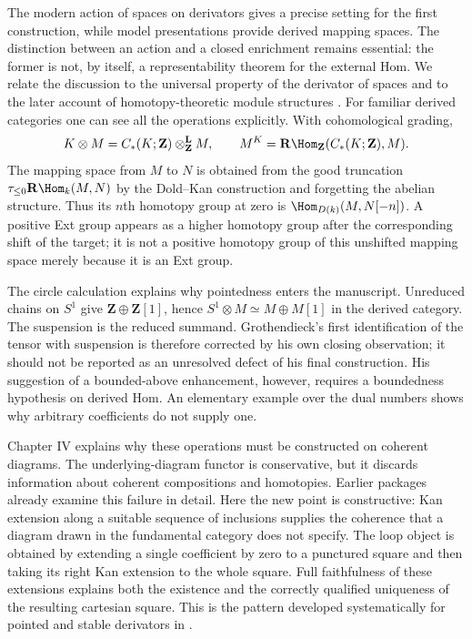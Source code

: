 The modern action of spaces on derivators gives a precise setting for the
first construction, while model presentations provide derived mapping spaces.
The distinction between an action and a closed enrichment remains essential:
the former is not, by itself, a representability theorem for the external
Hom. We relate the discussion to the universal property of the derivator of
spaces and to the later account of homotopy-theoretic module structures
\citep{Cisinski2008,GrothShulman2017}. For familiar derived categories one can
see all the operations explicitly. With cohomological grading,
\[
 K\otimes M=C_*(K;\mathbf Z)\otimes^{\mathbf L}_{\mathbf Z}M,
 \qquad
 M^K=\mathbf R\Hom_{\mathbf Z}(C_*(K;\mathbf Z),M).
\]
The mapping space from $M$ to $N$ is obtained from the good truncation
$\tau_{\leq0}\mathbf R\Hom_k(M,N)$ by the Dold--Kan construction and
forgetting the abelian structure. Thus its $n$th homotopy group at zero is
$\Hom_{D(k)}(M,N[-n])$. A positive Ext group appears as a higher homotopy
group after the corresponding shift of the target; it is not a positive
homotopy group of this unshifted mapping space merely because it is an Ext
group.

The circle calculation explains why pointedness enters the manuscript.
Unreduced chains on $S^1$ give $\mathbf Z\oplus\mathbf Z[1]$, hence
$S^1\otimes M\simeq M\oplus M[1]$ in the derived category. The suspension
is the reduced summand. Grothendieck's first identification of the tensor
with suspension is therefore corrected by his own closing observation; it
should not be reported as an unresolved defect of his final construction.
His suggestion of a bounded-above enhancement, however, requires a boundedness
hypothesis on derived Hom. An elementary example over the dual numbers shows
why arbitrary coefficients do not supply one.

Chapter IV explains why these operations must be constructed on coherent
diagrams. The underlying-diagram functor is conservative, but it discards
information about coherent compositions and homotopies. Earlier packages
already examine this failure in detail. Here the new point is constructive:
Kan extension along a suitable sequence of inclusions supplies the coherence
that a diagram drawn in the fundamental category does not specify.
The loop object is obtained by extending a single coefficient by zero to
a punctured square and then taking its right Kan extension to the whole
square. Full faithfulness of these extensions explains both the existence
and the correctly qualified uniqueness of the resulting cartesian square.
This is the pattern developed systematically for pointed and stable
derivators in \citet{Groth2013}.

